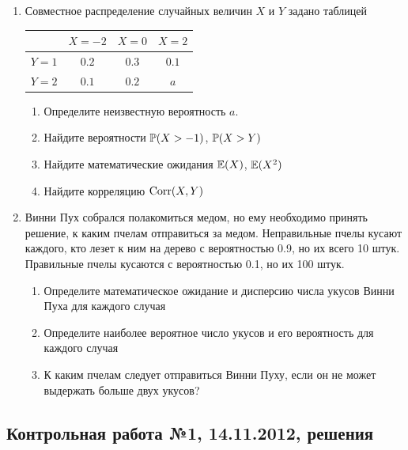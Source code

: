 \documentclass[12pt, a4paper]{article}\usepackage[]{graphicx}\usepackage[]{color}
\begin{document}
\begin{enumerate}
\item Совместное распределение случайных величин $X$ и $Y$ задано таблицей

\begin{tabular}{@{}cccc@{}}
\toprule
      & $X=-2$ & $X=0$ & $X=2$ \\ \midrule
$Y=1$ & $0.2$  & $0.3$ & $0.1$ \\
$Y=2$ & $0.1$  & $0.2$ & $a$   \\ \bottomrule
\end{tabular}

\begin{enumerate}
\item Определите неизвестную вероятность $a$.
\item Найдите вероятности $\P(X>-1)$, $\P(X>Y)$
\item Найдите математические ожидания $\E(X)$, $\E(X^2)$
\item Найдите корреляцию $\Corr(X,Y)$
\end{enumerate}

\item Винни Пух собрался полакомиться медом, но ему необходимо принять решение, к каким пчелам отправиться за медом. Неправильные пчелы кусают каждого, кто лезет к ним на дерево с вероятностью 0.9, но их всего 10 штук. Правильные пчелы кусаются с вероятностью 0.1, но их 100 штук.
\begin{enumerate}
\item  Определите математическое ожидание и дисперсию числа укусов Винни Пуха для каждого случая
\item Определите наиболее вероятное число укусов и его вероятность для каждого случая
\item К каким пчелам следует отправиться Винни Пуху, если он не может выдержать больше двух укусов?
\end{enumerate}
\end{enumerate}



\subsection{Контрольная работа №1, 14.11.2012, решения}
\end{document}
